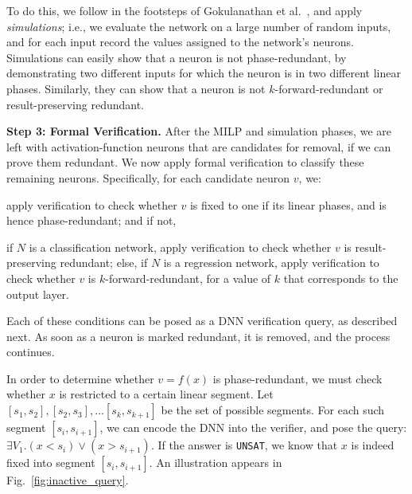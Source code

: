 \documentclass[10pt, conference, twocolumn, compsocconf]{IEEEtran}
\theoremstyle{remark}
\newcommand{\kfr}{$k$-forward-redundant}
\newcommand{\unsat}{\texttt{UNSAT}}
\begin{document}
To do this, we follow in the footsteps of Gokulanathan et
al.~\cite{GoFeMaBaKa20}, and apply \emph{simulations}; i.e., we
evaluate the network on a large number of random inputs, and for each
input record the values assigned to the network's neurons. Simulations
can easily show that a neuron is not phase-redundant, by demonstrating
two different inputs for which the neuron is in two different linear
phases. Similarly, they can show that a neuron is not \kfr{} or
result-preserving redundant.

\medskip
\noindent
\textbf{Step 3: Formal Verification.}  After the MILP and simulation
phases, we are left with activation-function neurons that are
candidates for removal, if we can prove them redundant. We now apply
formal verification to classify these remaining neurons. Specifically,
for each candidate neuron $v$, we:
\begin{inparaenum}[(i)]
\item apply verification to check whether $v$ is fixed to one if its
  linear phases, and is hence phase-redundant; and if not,
\item if $N$ is a classification network,
  apply verification to check whether $v$ is result-preserving
  redundant; else, if $N$ is a regression network, 
  apply verification to check whether $v$ is \kfr{}, for a value of $k$ that
  corresponds to the output layer.
\end{inparaenum}
Each of these conditions can be posed as a DNN verification query, as
described next. As soon as a neuron is marked redundant, it is
removed, and the process continues.

In order to determine whether $v=f(x)$ is phase-redundant, we must
check whether $x$ is restricted to a certain linear segment. Let
$[s_1,s_2], [s_2,s_3], \ldots [s_k,s_{k+1}]$ be the set of possible
segments. For each such segment $[s_i,s_{i+1}]$, we can encode the DNN into the
verifier, and pose the query: $\exists V_1. (x<s_i) \vee (x>s_{i+1})$. If
the answer is \unsat{}, we know that $x$ is indeed fixed into segment 
$[s_i,s_{i+1}]$. An illustration appears in Fig.~\ref{fig:inactive_query}.
\end{document}
